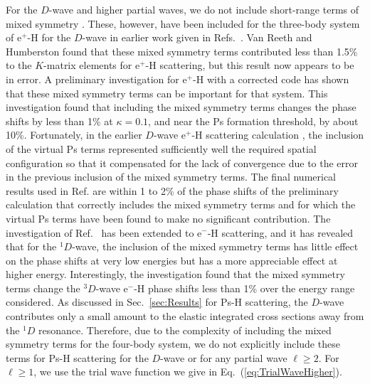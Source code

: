 \documentclass[preprint,showpacs,showkeys,preprintnumbers,amsmath,amssymb,longbibliography,pra,aps]{revtex4-1}
\begin{document}
For the $D$-wave and higher partial waves, we do not include short-range
terms of mixed symmetry \cite{Schwartz1961a}. These, however, have been
included for the three-body system of e$^+$-H for the $D$-wave in earlier
work given in
Refs.~\cite{Brown1985a,BrownThesis,WattsThesis,Humberston1997,VanReeth1997}.
Van Reeth and Humberston \cite{VanReeth1997} found that these
mixed symmetry terms contributed less than 1.5\% to the $K$-matrix elements
for e$^+$-H scattering, but this result now appears to be in error.
A preliminary investigation for e$^+$-H \cite{VanReeth2015} with a corrected
code has shown 
that these mixed symmetry terms can be important for that 
system. This investigation found that
including the mixed symmetry terms changes
the phase shifts by less than 1\% at $\kappa = 0.1$, and near the Ps formation
threshold, by about 10\%. Fortunately, in the earlier $D$-wave e$^+$-H
scattering
calculation \cite{Humberston1997}, the inclusion of the virtual Ps terms
represented sufficiently well the required spatial configuration so that it
compensated for the lack of convergence due to the
error in the previous inclusion of the mixed symmetry
terms. The final numerical results used in Ref. \cite{VanReeth1997} are
within 1 to 2\% of the phase shifts of the preliminary
calculation \cite{VanReeth2015} that correctly
includes the mixed symmetry terms and for which the virtual Ps terms have
been found to make no significant contribution. The investigation of
Ref.~\cite{VanReeth2015} has been extended to
e$^-$-H scattering, and it has revealed that
for the $^1D$-wave, the inclusion of the 
mixed symmetry terms has little effect on the phase shifts at very low
energies but has a more appreciable effect at higher energy. Interestingly,
the investigation found that the mixed symmetry terms change the
$^3D$-wave e$^-$-H phase shifts less than 1\% over the energy
range considered.
As discussed in Sec.~\ref{sec:Results} for Ps-H scattering, the $D$-wave
contributes only a small amount to the elastic integrated cross sections away 
from the $^1D$ resonance. %
Therefore, due to the complexity of including the mixed symmetry terms
for the four-body system, we do not explicitly include these terms for Ps-H scattering
for the $D$-wave or for any partial wave $\ell \ge 2$.
For $\ell \ge 1$, we use the trial wave function we give
in Eq.~(\ref{eq:TrialWaveHigher}).
\end{document}
